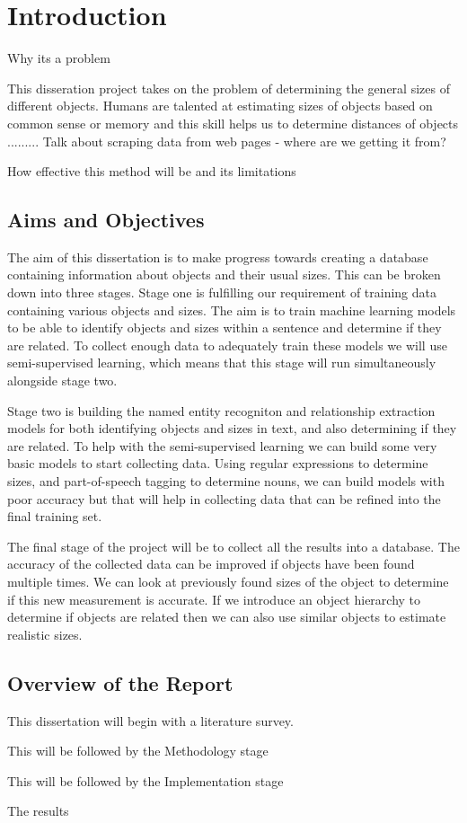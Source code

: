 \chapter{Introduction}

Why its a problem

This disseration project takes on the problem of determining the general sizes of different objects. Humans are talented at estimating sizes of objects based on common sense or memory and this skill helps us to determine distances of objects ......... Talk about scraping data from web pages - where are we getting it from?

How effective this method will be and its limitations


\section{Aims and Objectives}

The aim of this dissertation is to make progress towards creating a database containing information about objects and their usual sizes. This can be broken down into three stages. Stage one is fulfilling our requirement of training data containing various objects and sizes. The aim is to train machine learning models to be able to identify objects and sizes within a sentence and determine if they are related. To collect enough data to adequately train these models we will use semi-supervised learning, which means that this stage will run simultaneously alongside stage two.

Stage two is building the named entity recogniton and relationship extraction models for both identifying objects and sizes in text, and also determining if they are related. To help with the semi-supervised learning we can build some very basic models to start collecting data. Using regular expressions to determine sizes, and part-of-speech tagging to determine nouns, we can build models with poor accuracy but that will help in collecting data that can be refined into the final training set. 

The final stage of the project will be to collect all the results into a database. The accuracy of the collected data can be improved if objects have been found multiple times. We can look at previously found sizes of the object to determine if this new measurement is accurate. If we introduce an object hierarchy to determine if objects are related then we can also use similar objects to estimate realistic sizes.


\section{Overview of the Report}

This dissertation will begin with a literature survey.

This will be followed by the Methodology stage

This will be followed by the Implementation stage

The results